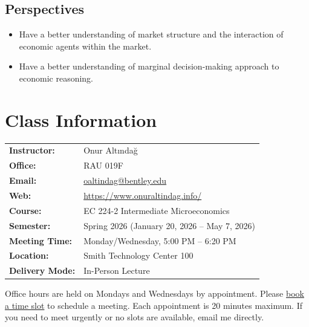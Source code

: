 \documentclass[11pt,letterpaper]{article}
\begin{document}
\subsection*{Perspectives}
\begin{itemize}
    \item Have a better understanding of market structure and the interaction of economic agents within the market.
    \item Have a better understanding of marginal decision-making approach to economic reasoning.
\end{itemize}

\section*{Class Information}

\begin{tabularx}{\textwidth}{@{}lX@{}}
\textbf{Instructor:} & Onur Altındağ \\
\textbf{Office:} & RAU 019F \\
\textbf{Email:} & \href{mailto:oaltindag@bentley.edu}{oaltindag@bentley.edu} \\
\textbf{Web:} & \url{https://www.onuraltindag.info/} \\[0.3cm]
\textbf{Course:} & EC 224-2 Intermediate Microeconomics \\
\textbf{Semester:} & Spring 2026 (January 20, 2026 – May 7, 2026) \\
\textbf{Meeting Time:} & Monday/Wednesday, 5:00 PM – 6:20 PM \\
\textbf{Location:} & Smith Technology Center 100 \\
\textbf{Delivery Mode:} & In-Person Lecture \\
\end{tabularx}

\vspace{0.3cm}

Office hours are held on Mondays and Wednesdays by appointment. Please \href{https://outlook.office.com/bookwithme/user/1c4e4f54e0f0493397e615b2c80a59c7\%40bentley.edu/meetingtype/PxtkOiMCu0m4QV32Y3tEaw2?bookingcode=097c05f0-ef41-47c9-9d76-fcf8bab2bc80&anonymous&ismsaljsauthenabled}{book a time slot} to schedule a meeting. Each appointment is 20 minutes maximum. If you need to meet urgently or no slots are available, email me directly.
\end{document}
